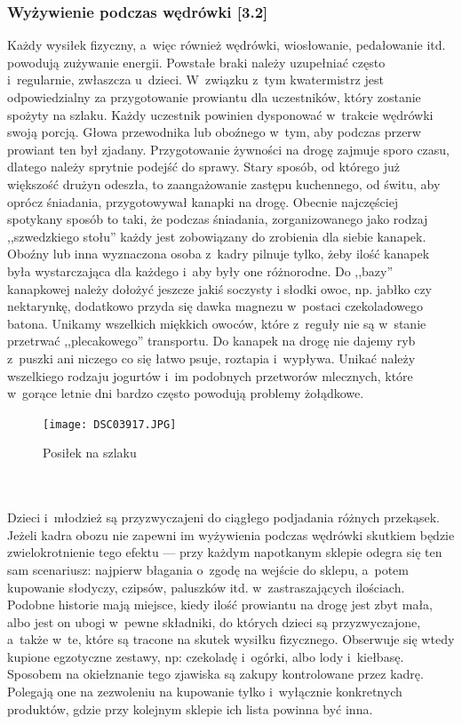 \documentclass[a5paper,10pt,titlepage,twoside]{article}
\begin{document}
\subsubsection{Wyżywienie podczas wędrówki [3.2]}
Każdy wysiłek fizyczny, a~więc również wędrówki, wiosłowanie, pedałowanie itd. powodują zużywanie energii. Powstałe braki należy uzupełniać często i~regularnie, zwłaszcza u~dzieci. W~związku z~tym kwatermistrz jest odpowiedzialny za przygotowanie prowiantu dla uczestników, który zostanie spożyty na szlaku. Każdy uczestnik powinien dysponować w~trakcie wędrówki swoją porcją. Głowa przewodnika lub oboźnego w~tym, aby podczas przerw prowiant ten był zjadany. Przygotowanie żywności na drogę zajmuje sporo czasu, dlatego należy sprytnie podejść do sprawy. Stary sposób, od którego już większość drużyn odeszła, to zaangażowanie zastępu kuchennego, od świtu, aby oprócz śniadania, przygotowywał kanapki na drogę. Obecnie najczęściej spotykany sposób to taki, że podczas śniadania, zorganizowanego jako rodzaj ,,szwedzkiego stołu'' każdy jest zobowiązany do zrobienia dla siebie kanapek. Oboźny lub inna wyznaczona osoba z~kadry pilnuje tylko, żeby ilość kanapek była wystarczająca dla każdego i~aby były one różnorodne. Do ,,bazy'' kanapkowej należy dołożyć jeszcze jakiś soczysty i słodki owoc, np. jabłko czy nektarynkę, dodatkowo przyda się dawka magnezu w~postaci czekoladowego batona. Unikamy wszelkich miękkich owoców, które z~reguły nie są w~stanie przetrwać ,,plecakowego'' transportu. Do kanapek na drogę nie dajemy ryb z~puszki ani niczego co się łatwo psuje, roztapia i~wypływa. Unikać należy wszelkiego rodzaju jogurtów i~im podobnych przetworów mlecznych, które w~gorące letnie dni bardzo często powodują problemy żołądkowe.
\begin{figure}[htp]
\centering
\texttt{[image: DSC03917.JPG]}
\caption{Posiłek na szlaku}\label{prowiant}
\end{figure}
\\
\\
Dzieci i~młodzież są przyzwyczajeni do ciągłego podjadania różnych przekąsek. Jeżeli kadra obozu nie zapewni im wyżywienia podczas wędrówki skutkiem będzie zwielokrotnienie tego efektu --- przy każdym napotkanym sklepie odegra się ten sam scenariusz: najpierw błagania o~zgodę na wejście do sklepu, a~potem kupowanie słodyczy, czipsów, paluszków itd. w~zastraszających ilościach. Podobne historie mają miejsce, kiedy ilość prowiantu na drogę jest zbyt mała, albo jest on ubogi w~pewne składniki, do których dzieci są przyzwyczajone, a~także w~te, które są tracone na skutek wysiłku fizycznego. Obserwuje się wtedy kupione egzotyczne zestawy, np: czekoladę i~ogórki, albo lody i~kiełbasę. Sposobem na okiełznanie tego zjawiska są zakupy kontrolowane przez kadrę. Polegają one na zezwoleniu na kupowanie tylko i~wyłącznie konkretnych produktów, gdzie przy kolejnym sklepie ich lista powinna być inna.
\end{document}
